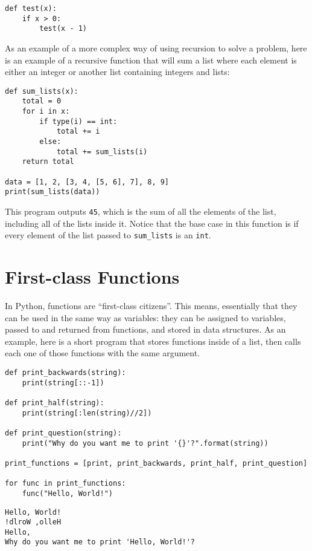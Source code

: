 \documentclass[11pt]{cselabheader}
\begin{document}
\begin{lstlisting}[style=python]
def test(x):
    if x > 0:
        test(x - 1)
\end{lstlisting}

As an example of a more complex way of using recursion to solve a problem, here is an example of a recursive function that will sum a list where each element is either an integer or another list containing integers and lists:

\begin{lstlisting}[style=python]
def sum_lists(x):
    total = 0
    for i in x:
        if type(i) == int:
            total += i
        else:
            total += sum_lists(i)
    return total

data = [1, 2, [3, 4, [5, 6], 7], 8, 9]
print(sum_lists(data))
\end{lstlisting}

This program outputs \lstinline{45}, which is the sum of all the elements of the list, including all of the lists inside it. Notice that the base case in this function is if every element of the list passed to \lstinline{sum_lists} is an \lstinline{int}.

\section{First-class Functions}
\label{subsec:first}
In Python, functions are ``first-class citizens''. This means, essentially that they can be used in the same way as variables: they can be assigned to variables, passed to and returned from functions, and stored in data structures. As an example, here is a short program that stores functions inside of a list, then calls each one of those functions with the same argument.

\begin{lstlisting}[style=python]
def print_backwards(string):
    print(string[::-1])

def print_half(string):
    print(string[:len(string)//2])

def print_question(string):
    print("Why do you want me to print '{}'?".format(string))

print_functions = [print, print_backwards, print_half, print_question]

for func in print_functions:
    func("Hello, World!")
\end{lstlisting}

\begin{lstlisting}[style=bash]
Hello, World!
!dlroW ,olleH
Hello,
Why do you want me to print 'Hello, World!'?
\end{lstlisting}
\end{document}
